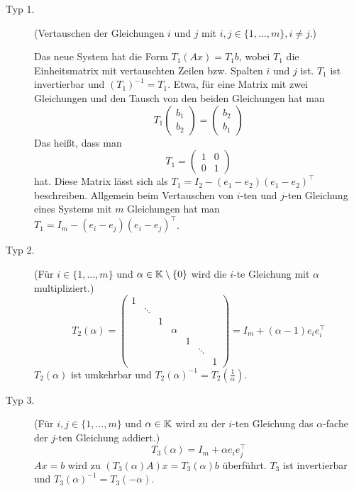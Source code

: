 \begin{description}
	\item[Typ 1.]
		(Vertauschen der Gleichungen $ i $ und $ j $ mit $ i,j \in \{ 1,\ldots,m \}, i \neq j $.)
		
		Das neue System hat die Form $ T_1(Ax) = T_1b $, wobei $ T_1 $ die Einheitsmatrix mit vertauschten Zeilen bzw. Spalten $ i $ und $ j $ ist. $ T_1 $ ist invertierbar und $ (T_1)^{-1}=T_1 $. Etwa, für eine Matrix mit zwei Gleichungen und den Tausch von den beiden Gleichungen hat man 
		\[ 
			T_1 \begin{pmatrix} b_1 \\ b_2 \end{pmatrix} = \begin{pmatrix} b_2 \\ b_1 \end{pmatrix} 
			\] 
			Das heißt, dass man 
			\[
				T_1 = \begin{pmatrix} 1 & 0 \\ 
					0 & 1 
				\end{pmatrix} 
			\]
			hat. Diese Matrix lässt sich als $T_1 = I_2 - (e_1 - e_2) (e_1 - e_2)^\top$ beschreiben. Allgemein beim Vertauschen von $i$-ten und $j$-ten Gleichung eines Systems mit $m$ Gleichungen hat man 
			$T_1 = I_m - (e_i-e_j)(e_i-e_j)^\top$. 
	\item[Typ 2.]
		(Für $ i\in\{ 1,\ldots,m \} $ und $ \alpha\in\mathbb K\setminus\{0\} $ wird die $ i $-te Gleichung mit $ \alpha $ multipliziert.)
		\begin{equation*}
			T_2(\alpha) =
			\left( \begin{matrix}
			1 &  &  &  &  &  &  \\ 
			 & \ddots &  &  &  &  &  \\ 
			 &  & 1 &  &  &  &  \\ 
			 &  &  & \alpha &  &  &  \\ 
			 &  &  &  & 1 &  &  \\ 
			 &  &  &  &  & \ddots &  \\ 
			 &  &  &  &  &  & 1
			\end{matrix} \right)
			= I_m + (\alpha-1)e_ie_i^\top
		\end{equation*}
		$ T_2(\alpha) $ ist umkehrbar und $ T_2(\alpha)^{-1} = T_2(\frac{1}{\alpha}) $.
	\item[Typ 3.]
		(Für $ i,j\in\{ 1,\ldots,m \} $ und $ \alpha\in\mathbb K $ wird zu der $ i $-ten Gleichung das $ \alpha $-fache der $ j $-ten Gleichung addiert.)
		\begin{equation*}
			T_3(\alpha) = I_m + \alpha e_ie_j^\top
		\end{equation*}
		$ Ax=b $ wird zu $ (T_3(\alpha)A)x = T_3(\alpha)b $ überführt. $ T_3 $ ist invertierbar und $ T_3(\alpha)^{-1} = T_3(-\alpha) $.
\end{description}


